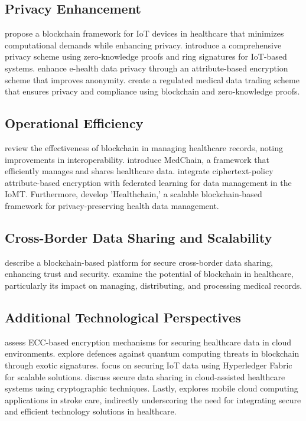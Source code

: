 \documentclass[cic,tc,english]{iiufrgs}
\begin{document}
    \subsection{Privacy Enhancement} \citet{Dwivedi2019} propose a blockchain framework for IoT devices in healthcare that minimizes computational demands while enhancing privacy. \citet{Esfahani2024} introduce a comprehensive privacy scheme using zero-knowledge proofs and ring signatures for IoT-based systems. \citet{Zala2024} enhance e-health data privacy through an attribute-based encryption scheme that improves anonymity. \citet{Li2024} create a regulated medical data trading scheme that ensures privacy and compliance using blockchain and zero-knowledge proofs.
    
    \subsection{Operational Efficiency} \citet{Vazirani2019} review the effectiveness of blockchain in managing healthcare records, noting improvements in interoperability. \citet{Shen2019} introduce MedChain, a framework that efficiently manages and shares healthcare data. \citet{Bhansali2022} integrate ciphertext-policy attribute-based encryption with federated learning for data management in the IoMT. Furthermore, \citet{XuJie2019} develop 'Healthchain,' a scalable blockchain-based framework for privacy-preserving health data management.
    
    \subsection{Cross-Border Data Sharing and Scalability} \citet{Rahman2020} describe a blockchain-based platform for secure cross-border data sharing, enhancing trust and security. \citet{Saeed2022} examine the potential of blockchain in healthcare, particularly its impact on managing, distributing, and processing medical records.
    
    \subsection{Additional Technological Perspectives} \citet{Hema2019} assess ECC-based encryption mechanisms for securing healthcare data in cloud environments. \citet{Naz2024} explore defences against quantum computing threats in blockchain through exotic signatures. \citet{Eghmazi2024} focus on securing IoT data using Hyperledger Fabric for scalable solutions. \citet{XuChang2019} discuss secure data sharing in cloud-assisted healthcare systems using cryptographic techniques. Lastly, \citet{Karaca2019} explores mobile cloud computing applications in stroke care, indirectly underscoring the need for integrating secure and efficient technology solutions in healthcare.
\end{document}
